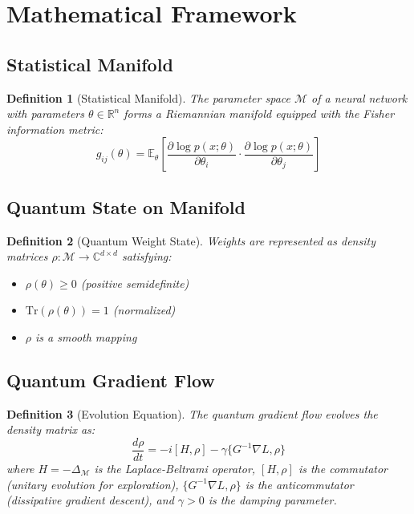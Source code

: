 \documentclass[11pt,a4paper]{article}
\newtheorem{definition}{Definition}
\begin{document}
\section{Mathematical Framework}

\subsection{Statistical Manifold}

\begin{definition}[Statistical Manifold]
The parameter space $\mathcal{M}$ of a neural network with parameters $\theta \in \mathbb{R}^n$ forms a Riemannian manifold equipped with the Fisher information metric:
\begin{equation}
    g_{ij}(\theta) = \mathbb{E}_\theta\left[\frac{\partial \log p(x;\theta)}{\partial \theta_i} \cdot \frac{\partial \log p(x;\theta)}{\partial \theta_j}\right]
\end{equation}
\end{definition}

\subsection{Quantum State on Manifold}

\begin{definition}[Quantum Weight State]
Weights are represented as density matrices $\rho: \mathcal{M} \to \mathbb{C}^{d \times d}$ satisfying:
\begin{itemize}
    \item $\rho(\theta) \geq 0$ (positive semidefinite)
    \item $\text{Tr}(\rho(\theta)) = 1$ (normalized)
    \item $\rho$ is a smooth mapping
\end{itemize}
\end{definition}

\subsection{Quantum Gradient Flow}

\begin{definition}[Evolution Equation]
The quantum gradient flow evolves the density matrix as:
\begin{equation}
    \frac{d\rho}{dt} = -i[H, \rho] - \gamma\{G^{-1}\nabla L, \rho\}
    \label{eq:evolution}
\end{equation}
where $H = -\Delta_\mathcal{M}$ is the Laplace-Beltrami operator, $[H,\rho]$ is the commutator (unitary evolution for exploration), $\{G^{-1}\nabla L, \rho\}$ is the anticommutator (dissipative gradient descent), and $\gamma > 0$ is the damping parameter.
\end{definition}
\end{document}
